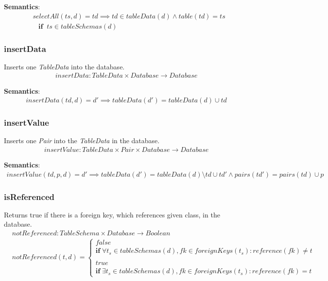 \documentclass[10pt]{article}
\begin{document}
\textbf{Semantics}:
\begin{align}
& selectAll(ts, d) = td \implies td \in tableData(d) \land table(td) = ts \nonumber \\
& \;\;\; \mathbf{if}  \;\; ts \in tableSchemas(d)
\end{align}

\subsubsection{insertData}
Inserts one \emph{TableData} into the database.
\begin{align}
insertData: TableData \times Database \rightarrow Database
\end{align}

\textbf{Semantics}:
\begin{align}
insertData(td, d) = d' \implies tableData(d') = tableData(d) \cup td 
\end{align}

\subsubsection{insertValue}
Inserts one \emph{Pair} into the \emph{TableData} in the database.
\begin{align}
insertValue: TableData \times Pair \times  Database \rightarrow Database
\end{align}

\textbf{Semantics}:
\begin{align}
insertValue(td, p, d) = d' \implies tableData(d') = tableData(d) \setminus td \cup td' \land pairs(td') = pairs(td) \cup p 
\end{align}


\subsubsection{isReferenced}
Returns true if there is a foreign key, which references given class, in the database.
\begin{align}
& notReferenced: TableSchema \times Database \rightarrow Boolean \\
& notReferenced(t, d) = \begin{cases}
 false \\
 \mathbf{if} \; \forall t_s \in tableSchemas(d), fk \in foreignKeys(t_s) : reference(fk) \neq t \\\\
 true \\
 \mathbf{if} \;  \exists t_s \in tableSchemas(d), fk \in foreignKeys(t_s) : reference(fk) = t
 \end{cases}
\end{align}
\end{document}
